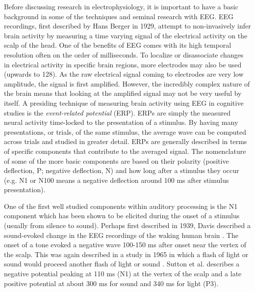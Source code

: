 Before discussing research in electrophysiology, it is important to have a basic background in some of the techniques and seminal research with EEG.  EEG recordings, first described by Hans Berger in 1929, attempt to non-invasively infer brain activity by measuring a time varying signal of the electrical activity on the scalp of the head.  One of the benefits of EEG comes with its high temporal resolution often on the order of milliseconds.  To localize or disassociate changes in electrical activity in specific brain regions, more electrodes may also be used (upwards to 128).  As the raw electrical signal coming to electrodes are very low amplitude, the signal is first amplified.  However, the incredibly complex nature of the brain means that looking at the amplified signal may not be very useful by itself.  A presiding technique of measuring brain activity using EEG in cognitive studies is the \textit{event-related potential} (ERP).  ERPs are simply the measured neural activity time-locked to the presentation of a stimulus.  By having many presentations, or trials, of the same stimulus, the average wave can be computed across trials and studied in greater detail.  ERPs are generally described in terms of specific components that contribute to the averaged signal.  The nomenclature of some of the more basic components are based on their polarity (positive deflection, P; negative deflection, N) and how long after a stimulus they occur (e.g. N1 or N100 means a negative deflection around 100 ms after stimulus presentation).  

One of the first well studied components within auditory processing is the N1 component which has been shown to be elicited during the onset of a stimulus (usually from silence to sound).  Perhaps first described in 1939, Davis described a sound-evoked change in the EEG recordings of the waking human brain \cite{Davis1939}.  The onset of a tone evoked a negative wave 100-150 ms after onset near the vertex of the scalp.  This was again described in a study in 1965 in which a flash of light or sound would proceed another flash of light or sound \cite{Sutton1965}.  Sutton et al. describes a negative potential peaking at 110 ms (N1) at the vertex of the scalp and a late positive potential at about 300 ms for sound and 340 ms for light (P3).  

